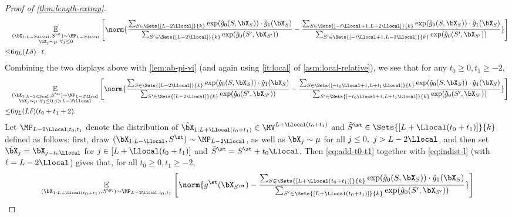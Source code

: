 \documentclass{article}
\begin{document}
\begin{proof}[Proof of \cref{thm:length-extrap}]
{\small\begin{align}
         & \E_{\substack{(\bX_{1:L-2\Llocal}, S^\st) \sim \MP_{L-2\Llocal} \\ \bX_j \sim \mu \ \forall j \leq 0}}\left[ \norm{  \frac{\sum_{S \in \Sets{[L-2\Llocal]}{k}}\exp(\hat g_0(S, \bX_S)) \cdot \hat g_1(\bX_S)}{\sum_{S' \in \Sets{[L-2\Llocal]}{k}} \exp(\hat g_0(S', \bX_{S'}))} -  \frac{\sum_{S \in \Sets{[-t\Llocal+1,L-2\Llocal]}{k}}\exp(\hat g_0(S, \bX_S)) \cdot \hat g_1(\bX_S)}{\sum_{S' \in \Sets{[-t\Llocal+1,L -2\Llocal]}{k}} \exp(\hat g_0(S', \bX_{S'}))}}\right] \nonumber\\
         \leq &  6\eta_L(L \delta)  \cdot t\nonumber.
       \end{align}}
     Combining the two displays above with \cref{lem:ab-pi-vi} (and again using \cref{it:local} of \cref{asm:local-relative}), we see that for any $t_0 \geq 0, t_1 \geq -2$,
     {\small\begin{align}
         & \E_{\substack{(\bX_{1:L-2\Llocal}, S^\st) \sim \MP_{L-2\Llocal} \\ \bX_j \sim \mu \ \forall j \leq 0, j > L-2\Llocal}}\left[ \norm{  \frac{\sum_{S \in \Sets{[L-2\Llocal]}{k}}\exp(\hat g_0(S, \bX_S)) \cdot \hat g_1(\bX_S)}{\sum_{S' \in \Sets{[L-2\Llocal]}{k}} \exp(\hat g_0(S', \bX_{S'}))} -  \frac{\sum_{S \in \Sets{[-t_0 \Llocal+1,L + t_1\Llocal]}{k}}\exp(\hat g_0(S, \bX_S)) \cdot \hat g_1(\bX_S)}{\sum_{S' \in \Sets{[-t_0\Llocal+1,L +t_1\Llocal]}{k}} \exp(\hat g_0(S', \bX_{S'}))}}\right] \nonumber\\
         \leq &  6\eta_L(L \delta)  (t_0 + t_1+2)\label{eq:add-t0-t1}.
            \end{align}}
          Let $\MP_{L-2\Llocal, t_0, t_1}$ denote the distribution of $\tilde \bX_{1:L + \Llocal(t_0 + t_1)} \in \MV^{L + \Llocal(t_0 + t_1)}$ and $\tilde S^\st \in \Sets{[L + \Llocal(t_0 + t_1)]}{k}$ defined as follows: first, draw $(\bX_{1:L-\Llocal}, S^\st) \sim \MP_{L-2\Llocal}$, as well as $\bX_j \sim \mu$ for all $j \leq 0, \ j > L-2\Llocal$, and then set $\tilde \bX_j = \bX_{j - t_0\Llocal}$ for $j \in [L + \Llocal(t_0 + t_1)]$ and $\tilde S^\st = S^\st + t_0 \Llocal$. Then \cref{eq:add-t0-t1} together with \cref{eq:indist-l} (with $\ell = L- 2\Llocal$) gives that, for all $t_0 \geq 0, t_1 \geq -2$, 
          \begin{align}
            & \E_{(\bX_{1:L + \Llocal(t_0 + t_1)}, S^\st) \sim \MP_{L-2\Llocal, t_0, t_1}}\left[ \norm{ g^\st(\bX_{S^\st}) - \frac{\sum_{S \in \Sets{[L + \Llocal(t_0 + t_1)]}{k}} \exp(\hat g_0(S, \bX_S)) \cdot \hat g_1(\bX_S)}{\sum_{S' \in \Sets{[L + \Llocal(t_0 + t_1)]}{k}} \exp(\hat g_0(S', \bX_{S'}))} } \right]\nonumber\\

\end{align}
\end{proof}
\end{document}
